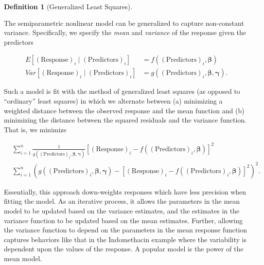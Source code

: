 \documentclass[
  letterpaper,
  DIV=11,
  numbers=noendperiod]{scrreprt}
\theoremstyle{definition}
\newtheorem{definition}{Definition}[chapter]
\theoremstyle{definition}
\theoremstyle{remark}
\begin{document}
\begin{definition}[Generalized Least
Squares]\protect\hypertarget{def-nlm-gls}{}\label{def-nlm-gls}

The semiparametric nonlinear model can be generalized to capture
non-constant variance. Specifically, we specify the \emph{mean} and
\emph{variance} of the response given the predictors

\[
\begin{aligned}
  E\left[(\text{Response})_i \mid (\text{Predictors})_i\right]
    &= f\left((\text{Predictors})_i, \boldsymbol{\beta}\right) \\
  Var\left[(\text{Response})_i \mid (\text{Predictors})_i\right]
    &= g\left((\text{Predictors})_i, \boldsymbol{\beta}, \boldsymbol{\gamma}\right).
\end{aligned}
\]

Such a model is fit with the method of generalized least squares (as
opposed to ``ordinary'' least squares) in which we alternate between (a)
minimizing a weighted distance between the observed response and the
mean function and (b) minimizing the distance between the squared
residuals and the variance function. That is, we minimize

\[
\begin{aligned}
  &\sum_{i=1}^{n} \frac{1}{g\left((\text{Predictors})_i, \boldsymbol{\beta}, \boldsymbol{\gamma}\right)} \left[(\text{Response})_i - f\left((\text{Predictors})_i, \boldsymbol{\beta}\right)\right]^2 \\
  &\sum_{i=1}^{n} \left(g\left((\text{Predictors})_i, \boldsymbol{\beta}, \boldsymbol{\gamma}\right) - \left[(\text{Response})_i - f\left((\text{Predictors})_i, \boldsymbol{\beta}\right)\right]^2\right)^2.
\end{aligned}
\]

\end{definition}

Essentially, this approach down-weights responses which have less
precision when fitting the model. As an iterative process, it allows the
parameters in the mean model to be updated based on the variance
estimates, and the estimates in the variance function to be updated
based on the mean estimates. Further, allowing the variance function to
depend on the parameters in the mean response function captures
behaviors like that in the Indomethacin example where the variability is
dependent upon the values of the response. A popular model is the power
of the mean model.
\end{document}
